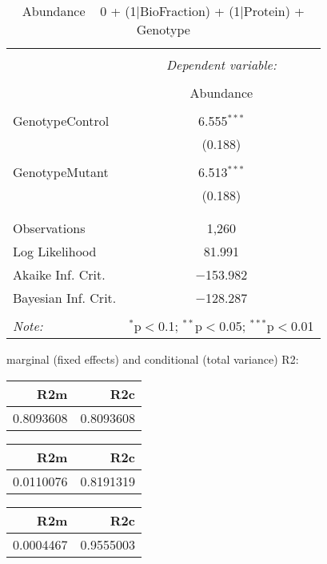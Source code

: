 \documentclass[11pt]{report}
\begin{document}
\begin{table}[!htbp] \centering 
  \caption{Abundance ~ 0 + (1|BioFraction) + (1|Protein) + Genotype} 
  \label{} 
\begin{tabular}{@{\extracolsep{5pt}}lc} 
\\[-1.8ex]\hline 
\hline \\[-1.8ex] 
 & \multicolumn{1}{c}{\textit{Dependent variable:}} \\ 
\cline{2-2} 
\\[-1.8ex] & Abundance \\ 
\hline \\[-1.8ex] 
 GenotypeControl & 6.555$^{***}$ \\ 
  & (0.188) \\ 
  & \\ 
 GenotypeMutant & 6.513$^{***}$ \\ 
  & (0.188) \\ 
  & \\ 
\hline \\[-1.8ex] 
Observations & 1,260 \\ 
Log Likelihood & 81.991 \\ 
Akaike Inf. Crit. & $-$153.982 \\ 
Bayesian Inf. Crit. & $-$128.287 \\ 
\hline 
\hline \\[-1.8ex] 
\textit{Note:}  & \multicolumn{1}{r}{$^{*}$p$<$0.1; $^{**}$p$<$0.05; $^{***}$p$<$0.01} \\ 
\end{tabular} 
\end{table} 
marginal (fixed effects) and conditional (total variance) R2:

\begin{tabular}{r|r}
\hline
R2m & R2c\\
\hline
0.8093608 & 0.8093608\\
\hline
\end{tabular}

\begin{tabular}{r|r}
\hline
R2m & R2c\\
\hline
0.0110076 & 0.8191319\\
\hline
\end{tabular}

\begin{tabular}{r|r}
\hline
R2m & R2c\\
\hline
0.0004467 & 0.9555003\\
\hline
\end{tabular}
\end{document}
